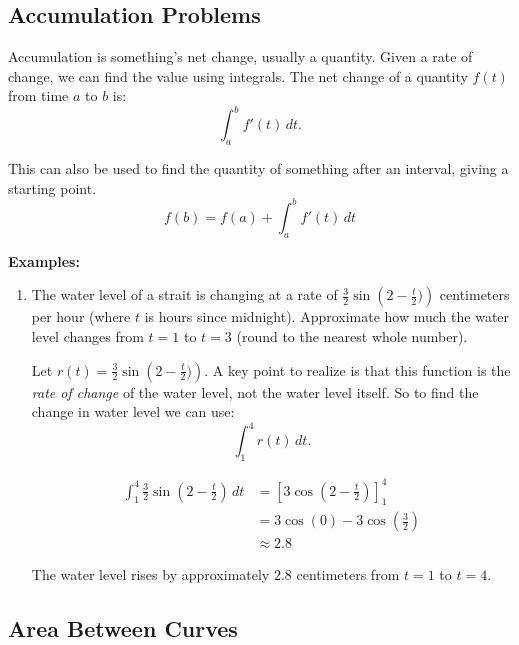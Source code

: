 \documentclass[12pt]{article}
\begin{document}
\subsection{Accumulation Problems}
Accumulation is something's net change, usually a quantity. Given a rate of change, we can find the value using integrals. The net change of a quantity $f(t)$ from time $a$ to $b$ is:
\[ \int_{a}^{b} f'(t) \, dt. \]

This can also be used to find the quantity of something after an interval, giving a starting point.
\[ f(b) = f(a) + \int_{a}^{b} f'(t) \, dt \]

\noindent \textbf{Examples:}
\begin{enumerate}
    \item The water level of a strait is changing at a rate of $\frac{3}{2} \sin \left(2- \frac{t}{2}) \right)$ centimeters per hour (where $t$ is hours since midnight). Approximate how much the water level changes from $t=1$ to $t=3$ (round to the nearest whole number).

          Let $r(t) = \frac{3}{2} \sin \left(2- \frac{t}{2}) \right)$. A key point to realize is that this function is the \textit{rate of change} of the water level, not the water level itself. So to find the change in water level we can use:
          \[ \int_{1}^{4} r(t) \, dt. \]

          \begin{align*}
              \int_{1}^{4} \frac{3}{2} \sin \left(2- \frac{t}{2} \right) \, dt & = \left[ 3 \cos \left(2 - \frac{t}{2} \right) \right]_1^4 \\[6pt]
                                                                               & = 3 \cos(0) - 3\cos \left( \frac{3}{2} \right)            \\[6pt]
                                                                               & \approx 2.8
          \end{align*}

          The water level rises by approximately $2.8$ centimeters from $t=1$ to $t=4$.
\end{enumerate} %

\subsection{Area Between Curves}
\end{document}
